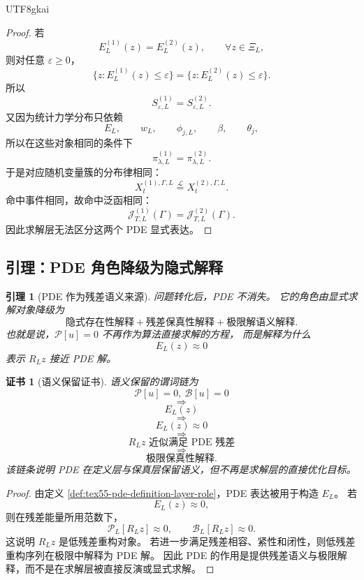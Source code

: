 \documentclass[12pt]{article}
\newtheorem{lemma}{引理}[section]
\newtheorem{Certificate}{证书}[section]
\begin{document}
\begin{CJK*}{UTF8}{gkai}
\begin{proof}
若
\[
  E_L^{(1)}(z)=E_L^{(2)}(z),
  \qquad
  \forall z\in\Xi_L,
\]
则对任意 \(\varepsilon\ge0\)，
\[
  \{z:E_L^{(1)}(z)\le\varepsilon\}
  =
  \{z:E_L^{(2)}(z)\le\varepsilon\}.
\]
所以
\[
  S_{\varepsilon,L}^{(1)}
  =
  S_{\varepsilon,L}^{(2)}.
\]
又因为统计力学分布只依赖
\[
  E_L,
  \qquad
  w_L,
  \qquad
  \phi_{j,L},
  \qquad
  \beta,
  \qquad
  \theta_j,
\]
所以在这些对象相同的条件下
\[
  \pi_{\lambda,L}^{(1)}
  =
  \pi_{\lambda,L}^{(2)}.
\]
于是对应随机变量簇的分布律相同：
\[
  X_t^{(1),\Gamma,L}
  \stackrel{\mathcal L}{=}
  X_t^{(2),\Gamma,L}.
\]
命中事件相同，故命中泛函相同：
\[
  \mathcal J_{T,L}^{(1)}(\Gamma)
  =
  \mathcal J_{T,L}^{(2)}(\Gamma).
\]
因此求解层无法区分这两个 PDE 显式表达。
\end{proof}

\subsection{引理：PDE 角色降级为隐式解释}
\label{subsec:tex55-pde-implicit-role}

\begin{lemma}[PDE 作为残差语义来源]
\label{lem:tex55-pde-residual-semantics}
问题转化后，PDE 不消失。
它的角色由显式求解对象降级为
\[
  \boxed{
  \text{隐式存在性解释}
  +
  \text{残差保真性解释}
  +
  \text{极限解语义解释}.
  }
\]
也就是说，\(\mathcal P[u]=0\) 不再作为算法直接求解的方程，
而是解释为什么
\[
  E_L(z)\approx0
\]
表示 \(R_Lz\) 接近 PDE 解。
\end{lemma}

\begin{Certificate}[语义保留证书]
\label{cert:tex55-pde-implicit-role}
语义保留的谓词链为
\[
  \mathcal P[u]=0,\ \mathcal B[u]=0
\]
\[
  \Longrightarrow
\]
\[
  E_L(z)
\]
\[
  \Longrightarrow
\]
\[
  E_L(z)\approx0
\]
\[
  \Longrightarrow
\]
\[
  R_Lz\text{ 近似满足 PDE 残差}
\]
\[
  \Longrightarrow
\]
\[
  \text{极限保真性解释}.
\]
该链条说明 PDE 在定义层与保真层保留语义，但不再是求解层的直接优化目标。
\end{Certificate}

\begin{proof}
由定义 \ref{def:tex55-pde-definition-layer-role}，PDE 表达被用于构造 \(E_L\)。
若
\[
  E_L(z)\approx0,
\]
则在残差能量所用范数下，
\[
  \mathcal P_L[R_Lz]\approx0,
  \qquad
  \mathcal B_L[R_Lz]\approx0.
\]
这说明 \(R_Lz\) 是低残差重构对象。
若进一步满足残差相容、紧性和闭性，则低残差重构序列在极限中解释为 PDE 解。
因此 PDE 的作用是提供残差语义与极限解释，而不是在求解层被直接反演或显式求解。
\end{proof}


\end{CJK*}
\end{document}
